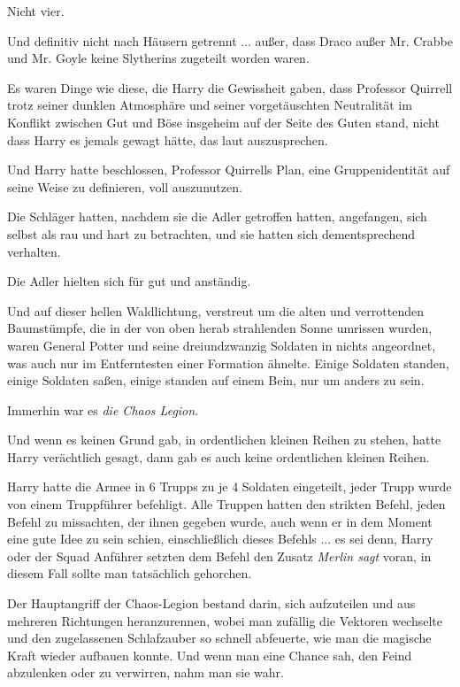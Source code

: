 Nicht vier.

Und definitiv nicht nach Häusern getrennt ... außer, dass Draco außer Mr. Crabbe
und Mr. Goyle keine Slytherins zugeteilt worden waren.

Es waren Dinge wie diese, die Harry die Gewissheit gaben, dass Professor
Quirrell trotz seiner dunklen Atmosphäre und seiner vorgetäuschten Neutralität
im Konflikt zwischen Gut und Böse insgeheim auf der Seite des Guten stand, nicht
dass Harry es jemals gewagt hätte, das laut auszusprechen.

Und Harry hatte beschlossen, Professor Quirrells Plan, eine Gruppenidentität auf
seine Weise zu definieren, voll auszunutzen.

Die Schläger hatten, nachdem sie die Adler getroffen hatten, angefangen, sich
selbst als rau und hart zu betrachten, und sie hatten sich dementsprechend
verhalten.

Die Adler hielten sich für gut und anständig.

Und auf dieser hellen Waldlichtung, verstreut um die alten und verrottenden
Baumstümpfe, die in der von oben herab strahlenden Sonne umrissen wurden, waren
General Potter und seine dreiundzwanzig Soldaten in nichts angeordnet, was auch
nur im Entferntesten einer Formation ähnelte. Einige Soldaten standen, einige
Soldaten saßen, einige standen auf einem Bein, nur um anders zu sein.

Immerhin war es \emph{die Chaos Legion}.

Und wenn es keinen Grund gab, in ordentlichen kleinen Reihen zu stehen, hatte
Harry verächtlich gesagt, dann gab es auch keine ordentlichen kleinen Reihen.

Harry hatte die Armee in 6 Trupps zu je 4 Soldaten eingeteilt, jeder Trupp wurde
von einem Truppführer befehligt. Alle Truppen hatten den strikten Befehl, jeden
Befehl zu missachten, der ihnen gegeben wurde, auch wenn er in dem Moment eine
gute Idee zu sein schien, einschließlich dieses Befehls ... es sei denn, Harry
oder der Squad Anführer setzten dem Befehl den Zusatz \emph{ \glqq{}Merlin
sagt\grqq{}} voran, in diesem Fall sollte man tatsächlich gehorchen.

Der Hauptangriff der Chaos-Legion bestand darin, sich aufzuteilen und aus
mehreren Richtungen heranzurennen, wobei man zufällig die Vektoren wechselte und
den zugelassenen Schlafzauber so schnell abfeuerte, wie man die magische Kraft
wieder aufbauen konnte. Und wenn man eine Chance sah, den Feind abzulenken oder
zu verwirren, nahm man sie wahr.

